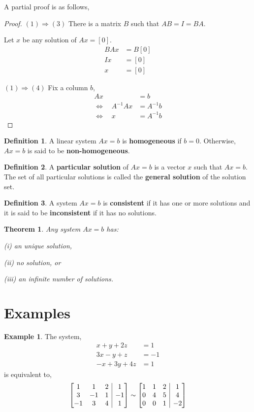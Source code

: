 \documentclass{report}
\makeatletter
\newenvironment{amatrix}[1]{%
  \left[\begin{array}{@{}*{#1}{c}|c@{}}
}{%
  \end{array}\right]
}
\newtheorem{_thm}{Theorem}
\theoremstyle{definition}
\newtheorem{_def}{Definition}
\newtheorem{ex}{Example}
\makeatother
\begin{document}
A partial proof is as follows,
\begin{proof}
$(1)\Rightarrow (3)$ There is a matrix $B$ such that $AB=I=BA$.

Let $x$ be any solution of $Ax=[0]$.
\begin{align*}
BAx &= B[0] \\
Ix &= [0] \\
x &= [0]
\end{align*}

$(1)\Rightarrow (4)$ Fix a column $b$,
\begin{align*}
Ax &= b \\
\Leftrightarrow \quad A^{-1}Ax &= A^{-1}b \\
\Leftrightarrow \quad x &= A^{-1}b
\end{align*}
\end{proof}

\begin{_def}
A linear system $Ax=b$ is \textbf{homogeneous} if $b=0$.
Otherwise, $Ax=b$ is said to be \textbf{non-homogeneous}.
\end{_def}

\begin{_def}
A \textbf{particular solution} of $Ax=b$ is a vector $x$ such that $Ax=b$.
The set of all particular solutions is called the \textbf{general solution} of the solution set.
\end{_def}

\begin{_def}
A system $Ax=b$ is \textbf{consistent} if it has one or more solutions and it is said to be \textbf{inconsistent} if it has no solutions.
\end{_def}

\begin{_thm}
Any system $Ax=b$ has:

(i) an unique solution, 

(ii) no solution, or

(iii) an infinite number of solutions.
\end{_thm}

\section{Examples}

\begin{ex}
The system,
\begin{align*}
x+y+2z&=1 \\
3x-y+z&=-1 \\
-x+3y+4z&=1
\end{align*}
is equivalent to,
\[
\begin{amatrix}{3}
   1 & 1 & 2 & 1 \\
   3 & -1 & 1 & -1 \\
   -1 & 3 & 4 & 1
\end{amatrix}\sim
\begin{amatrix}{3}
   1 & 1 & 2 & 1 \\
   0 & 4 & 5 & 4 \\
   0 & 0 & 1 & -2
\end{amatrix}\]
\end{ex}
\end{document}
